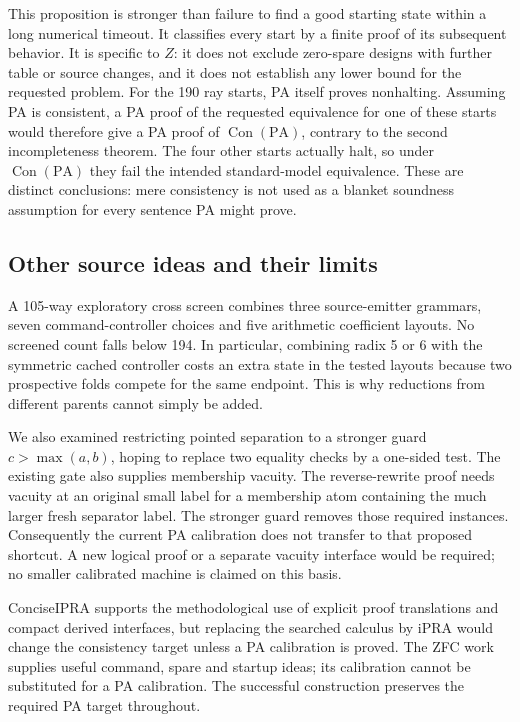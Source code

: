 \documentclass[11pt,letterpaper]{article}
\newcommand{\PA}{\mathrm{PA}}
\newcommand{\Con}{\operatorname{Con}}
\begin{document}
This proposition is stronger than failure to find a good starting state
within a long numerical timeout. It classifies every start by a finite
proof of its subsequent behavior. It is specific to $Z$: it does not
exclude zero-spare designs with further table or source changes, and it
does not establish any lower bound for the requested problem.
For the 190 ray starts, PA itself proves nonhalting. Assuming PA is
consistent, a PA proof of the requested equivalence for one of these
starts would therefore give a PA proof of $\Con(\PA)$, contrary to the
second incompleteness theorem. The four other starts actually halt, so
under $\Con(\PA)$ they fail the intended standard-model equivalence.
These are distinct conclusions: mere consistency is not used as a
blanket soundness assumption for every sentence PA might prove.

\subsection{Other source ideas and their limits}

A 105-way exploratory cross screen combines three source-emitter grammars,
seven command-controller choices and five arithmetic coefficient layouts.
No screened count falls below 194. In particular, combining radix 5 or 6
with the symmetric cached controller costs an extra state in the tested
layouts because two prospective folds compete for the same endpoint.
This is why reductions from different parents cannot simply be added.

We also examined restricting pointed separation to a stronger guard
$c>\max(a,b)$, hoping to replace two equality checks by a one-sided test.
The existing gate also supplies membership vacuity. The reverse-rewrite
proof needs vacuity at an original small label for a membership atom
containing the much larger fresh separator label. The stronger guard
removes those required instances. Consequently the current PA calibration
does not transfer to that proposed shortcut. A new logical proof or a
separate vacuity interface would be required; no smaller calibrated
machine is claimed on this basis.

ConciseIPRA supports the methodological use of explicit proof translations
and compact derived interfaces, but replacing the searched calculus by
iPRA would change the consistency target unless a PA calibration is proved.
The ZFC work supplies useful command, spare and startup ideas; its
calibration cannot be substituted for a PA calibration. The successful
construction preserves the required PA target throughout.
\end{document}
